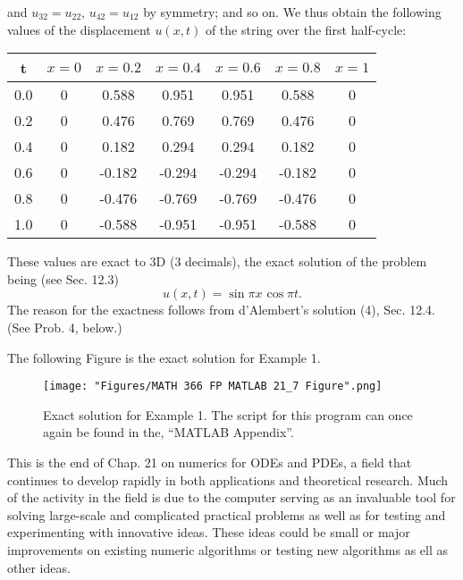 and $u_{32}=u_{22}$, $u_{42}=u_{12}$ by symmetry; and so on. We thus obtain the following values of the displacement $u(x,t)$ of the string over the first half-cycle:%
\begin{table}[htp]
\begin{center}
\begin{tabular}{|c c c c c c c|}
\hline t & $x=0$ & $x=0.2$ & $x=0.4$ & $x=0.6$ & $x=0.8$ & $x=1$ \\ \hline
0.0 & 0 & 0.588 & 0.951 & 0.951 & 0.588 & 0 \\
0.2 & 0 & 0.476 & 0.769 & 0.769 & 0.476 & 0 \\
0.4 & 0 & 0.182 & 0.294 & 0.294 & 0.182 & 0 \\
0.6 & 0 & -0.182 & -0.294 & -0.294 & -0.182 & 0 \\
0.8 & 0 & -0.476 & -0.769 & -0.769 & -0.476 & 0 \\
1.0 & 0 & -0.588 & -0.951 & -0.951 & -0.588 & 0 \\ \hline
\end{tabular}
\end{center}
\end{table}%
\newline
These values are exact to 3D (3 decimals), the exact solution of the problem being (see Sec. 12.3)
\begin{equation*}
u(x,t)=\sin{\pi x} \hspace{1pt} \cos{\pi t}.
\end{equation*}
The reason for the exactness follows from d'Alembert's solution (4), Sec. 12.4. (See Prob. 4, below.) 

The following Figure is the exact solution for Example 1. \newline
\begin{figure}[htbp]
\begin{center}
\texttt{[image: "Figures/MATH 366 FP MATLAB 21\_7 Figure".png]}
\caption*{Exact solution for Example 1. The script for this program can once again be found in the, ``MATLAB Appendix''.}
\end{center}
\end{figure}
\ebox
\newpage
This is the end of Chap. 21 on numerics for ODEs and PDEs, a field that continues to develop rapidly in both applications and theoretical research. Much of the activity in the field is due to the computer serving as an invaluable tool for solving large-scale and complicated practical problems as well as for testing and experimenting with innovative ideas. These ideas could be small or major improvements on existing numeric algorithms or testing new algorithms as ell as other ideas.